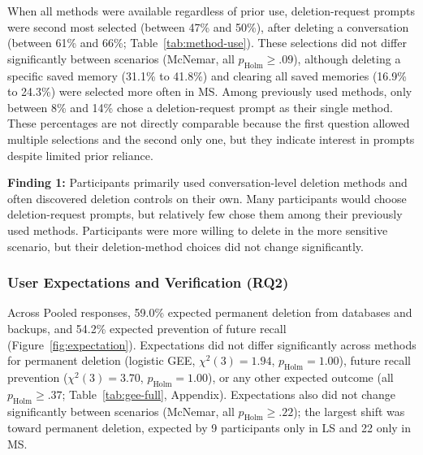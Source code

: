     When all methods were available regardless of prior use, deletion-request prompts were second most selected (between 47\% and 50\%), after deleting a conversation (between 61\% and 66\%; Table~\ref{tab:method-use}).
    These selections did not differ significantly between scenarios (McNemar, all $p_{\mathrm{Holm}}\geq.09$), although deleting a specific saved memory (31.1\% to 41.8\%) and clearing all saved memories (16.9\% to 24.3\%) were selected more often in MS.
    Among previously used methods, only between 8\% and 14\% chose a deletion-request prompt as their single method.
    These percentages are not directly comparable because the first question allowed multiple selections and the second only one, but they indicate interest in prompts despite limited prior reliance.



    \begin{takeawaybox}
    \textbf{Finding 1:} Participants primarily used conversation-level deletion methods and often discovered deletion controls on their own. Many participants would choose deletion-request prompts, but relatively few chose them among their previously used methods. Participants were more willing to delete in the more sensitive scenario, but their deletion-method choices did not change significantly.
    \end{takeawaybox}


    \subsubsection{User Expectations and Verification (RQ2)}
    \label{sec:user_verification}

    Across Pooled responses, 59.0\% expected permanent deletion from databases and backups, and 54.2\% expected prevention of future recall (Figure~\ref{fig:expectation}).
    Expectations did not differ significantly across methods for permanent deletion (logistic GEE, $\chi^2(3)=1.94$, $p_{\mathrm{Holm}}=1.00$), future recall prevention ($\chi^2(3)=3.70$, $p_{\mathrm{Holm}}=1.00$), or any other expected outcome (all $p_{\mathrm{Holm}}\geq.37$; Table~\ref{tab:gee-full}, Appendix).
    Expectations also did not change significantly between scenarios (McNemar, all $p_{\mathrm{Holm}}\geq.22$); the largest shift was toward permanent deletion, expected by 9 participants only in LS and 22 only in MS.

